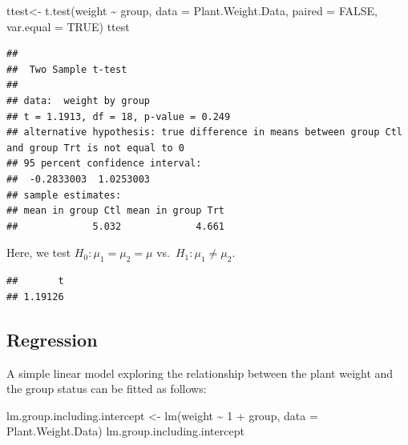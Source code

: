 \documentclass[
]{book}
\newenvironment{Shaded}{\begin{snugshade}}{\end{snugshade}}
\newcommand{\AttributeTok}[1]{\textcolor[rgb]{0.77,0.63,0.00}{#1}}
\newcommand{\ConstantTok}[1]{\textcolor[rgb]{0.00,0.00,0.00}{#1}}
\newcommand{\DecValTok}[1]{\textcolor[rgb]{0.00,0.00,0.81}{#1}}
\newcommand{\FunctionTok}[1]{\textcolor[rgb]{0.00,0.00,0.00}{#1}}
\newcommand{\NormalTok}[1]{#1}
\newcommand{\OtherTok}[1]{\textcolor[rgb]{0.56,0.35,0.01}{#1}}
\newcommand{\SpecialCharTok}[1]{\textcolor[rgb]{0.00,0.00,0.00}{#1}}
\begin{document}
\begin{Shaded}
\begin{Highlighting}[]
\NormalTok{ttest}\OtherTok{\textless{}{-}} \FunctionTok{t.test}\NormalTok{(weight }\SpecialCharTok{\textasciitilde{}}\NormalTok{ group, }\AttributeTok{data =}\NormalTok{ Plant.Weight.Data, }
               \AttributeTok{paired =} \ConstantTok{FALSE}\NormalTok{, }\AttributeTok{var.equal =} \ConstantTok{TRUE}\NormalTok{)}
\NormalTok{ttest}
\end{Highlighting}
\end{Shaded}

\begin{verbatim}
## 
##  Two Sample t-test
## 
## data:  weight by group
## t = 1.1913, df = 18, p-value = 0.249
## alternative hypothesis: true difference in means between group Ctl and group Trt is not equal to 0
## 95 percent confidence interval:
##  -0.2833003  1.0253003
## sample estimates:
## mean in group Ctl mean in group Trt 
##             5.032             4.661
\end{verbatim}

Here, we test \(H_0 : \mu_1 = \mu_2 = \mu\) vs.~\(H_1 : \mu_1 \ne \mu_2\).

\begin{Shaded}
\end{Shaded}

\begin{verbatim}
##       t 
## 1.19126
\end{verbatim}

\hypertarget{regression}{%
\subsection{Regression}\label{regression}}

A simple linear model exploring the relationship between the plant weight and the group status can be fitted as follows:

\begin{Shaded}
\begin{Highlighting}[]
\NormalTok{lm.group.including.intercept }\OtherTok{\textless{}{-}} \FunctionTok{lm}\NormalTok{(weight }\SpecialCharTok{\textasciitilde{}} \DecValTok{1} \SpecialCharTok{+}\NormalTok{ group, }\AttributeTok{data =}\NormalTok{ Plant.Weight.Data)}
\NormalTok{lm.group.including.intercept}
\end{Highlighting}
\end{Shaded}
\end{document}
